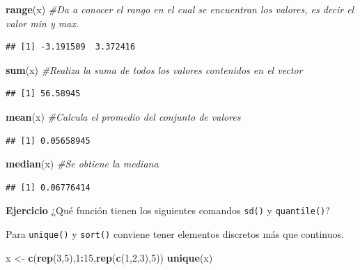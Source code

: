\documentclass[
]{book}
\newenvironment{Shaded}{\begin{snugshade}}{\end{snugshade}}
\newcommand{\CommentTok}[1]{\textcolor[rgb]{0.56,0.35,0.01}{\textit{#1}}}
\newcommand{\DecValTok}[1]{\textcolor[rgb]{0.00,0.00,0.81}{#1}}
\newcommand{\FunctionTok}[1]{\textcolor[rgb]{0.13,0.29,0.53}{\textbf{#1}}}
\newcommand{\NormalTok}[1]{#1}
\newcommand{\OtherTok}[1]{\textcolor[rgb]{0.56,0.35,0.01}{#1}}
\newcommand{\SpecialCharTok}[1]{\textcolor[rgb]{0.81,0.36,0.00}{\textbf{#1}}}
\begin{document}
\begin{Shaded}
\begin{Highlighting}[]
\FunctionTok{range}\NormalTok{(x) }\CommentTok{\#Da a conocer el rango en el cual se encuentran los valores, es decir el valor min y max. }
\end{Highlighting}
\end{Shaded}

\begin{verbatim}
## [1] -3.191509  3.372416
\end{verbatim}

\begin{Shaded}
\begin{Highlighting}[]
\FunctionTok{sum}\NormalTok{(x) }\CommentTok{\#Realiza la suma de todos los valores contenidos en el vector }
\end{Highlighting}
\end{Shaded}

\begin{verbatim}
## [1] 56.58945
\end{verbatim}

\begin{Shaded}
\begin{Highlighting}[]
\FunctionTok{mean}\NormalTok{(x) }\CommentTok{\#Calcula el promedio del conjunto de valores }
\end{Highlighting}
\end{Shaded}

\begin{verbatim}
## [1] 0.05658945
\end{verbatim}

\begin{Shaded}
\begin{Highlighting}[]
\FunctionTok{median}\NormalTok{(x) }\CommentTok{\#Se obtiene la mediana }
\end{Highlighting}
\end{Shaded}

\begin{verbatim}
## [1] 0.06776414
\end{verbatim}

\textbf{Ejercicio} ¿Qué función tienen los siguientes comandos \texttt{sd()} y \texttt{quantile()}?

Para \texttt{unique()} y \texttt{sort()} conviene tener elementos discretos más que continuos.

\begin{Shaded}
\begin{Highlighting}[]
\NormalTok{x }\OtherTok{\textless{}{-}} \FunctionTok{c}\NormalTok{(}\FunctionTok{rep}\NormalTok{(}\DecValTok{3}\NormalTok{,}\DecValTok{5}\NormalTok{),}\DecValTok{1}\SpecialCharTok{:}\DecValTok{15}\NormalTok{,}\FunctionTok{rep}\NormalTok{(}\FunctionTok{c}\NormalTok{(}\DecValTok{1}\NormalTok{,}\DecValTok{2}\NormalTok{,}\DecValTok{3}\NormalTok{),}\DecValTok{5}\NormalTok{))}
\FunctionTok{unique}\NormalTok{(x)}
\end{Highlighting}
\end{Shaded}
\end{document}
